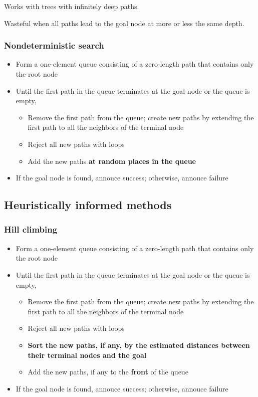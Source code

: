 \documentclass{article}
\begin{document}
Works with trees with infinitely deep paths.

Wasteful when all paths lead to the goal node at more or less the same depth.

\subsubsection{Nondeterministic search}

\begin{itemize}
  \item Form a one-element queue consisting of a zero-length path
    that contains only the root node
  \item Until the first path in the queue terminates at the goal node 
    or the queue is empty,
    \begin{itemize}
      \item Remove the first path from the queue; create new paths
        by extending the first path to all the neighbors of the 
        terminal node
      \item Reject all new paths with loops
      \item Add the new paths \textbf{at random places in the queue}
    \end{itemize}
  \item If the goal node is found, annouce success; otherwise, annouce 
    failure
\end{itemize}

\subsection{Heuristically informed methods}

\subsubsection{Hill climbing}

\begin{itemize}
  \item Form a one-element queue consisting of a zero-length path
    that contains only the root node
  \item Until the first path in the queue terminates at the goal node 
    or the queue is empty,
    \begin{itemize}
      \item Remove the first path from the queue; create new paths
        by extending the first path to all the neighbors of the 
        terminal node
      \item Reject all new paths with loops
      \item \textbf{Sort the new paths, if any, by the estimated distances 
        between their terminal nodes and the goal}
      \item Add the new paths, if any to the \textbf{front} of the queue
    \end{itemize}
  \item If the goal node is found, annouce success; otherwise, annouce 
    failure
\end{itemize}
\end{document}
